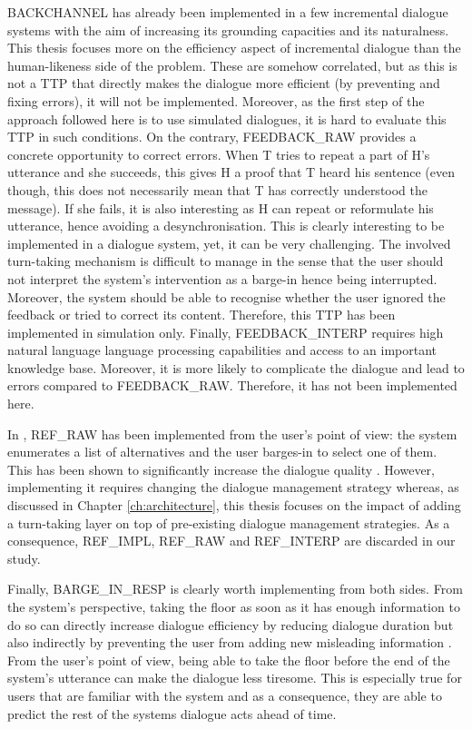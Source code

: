 				BACKCHANNEL has already been implemented in a few incremental dialogue systems \cite{Meena2013,Hastie2013} with the aim of increasing its grounding capacities and its naturalness. This thesis focuses more on the efficiency aspect of incremental dialogue than the human-likeness side of the problem. These are somehow correlated, but as this is not a TTP that directly makes the dialogue more efficient (by preventing and fixing errors), it will not be implemented. Moreover, as the first step of the approach followed here is to use simulated dialogues, it is hard to evaluate this TTP in such conditions. On the contrary, FEEDBACK\_RAW provides a concrete opportunity to correct errors. When T tries to repeat a part of H's utterance and she succeeds, this gives H a proof that T heard his sentence (even though, this does not necessarily mean that T has correctly understood the message). If she fails, it is also interesting as H can repeat or reformulate his utterance, hence avoiding a desynchronisation. This is clearly interesting to be implemented in a dialogue system, yet, it can be very challenging. The involved turn-taking mechanism is difficult to manage in the sense that the user should not interpret the system's intervention as a barge-in hence being interrupted. Moreover, the system should be able to recognise whether the user ignored the feedback or tried to correct its content. Therefore, this TTP has been implemented in simulation only. Finally, FEEDBACK\_INTERP requires high natural language language processing capabilities and access to an important knowledge base. Moreover, it is more likely to complicate the dialogue and lead to errors compared to FEEDBACK\_RAW. Therefore, it has not been implemented here.

				In \cite{El-Asri2014a}, REF\_RAW has been implemented from the user's point of view: the system enumerates a list of alternatives and the user barges-in to select one of them. This has been shown to significantly increase the dialogue quality \cite{El-Asri2014c}. However, implementing it requires changing the dialogue management strategy whereas, as discussed in Chapter \ref{ch:architecture}, this thesis focuses on the impact of adding a turn-taking layer on top of pre-existing dialogue management strategies. As a consequence, REF\_IMPL, REF\_RAW and REF\_INTERP are discarded in our study.

				Finally, BARGE\_IN\_RESP is clearly worth implementing from both sides. From the system's perspective, taking the floor as soon as it has enough information to do so can directly increase dialogue efficiency by reducing dialogue duration but also indirectly by preventing the user from adding new misleading information \cite{Ghigi2014}. From the user's point of view, being able to take the floor before the end of the system's utterance can make the dialogue less tiresome. This is especially true for users that are familiar with the system and as a consequence, they are able to predict the rest of the systems dialogue acts ahead of time.

